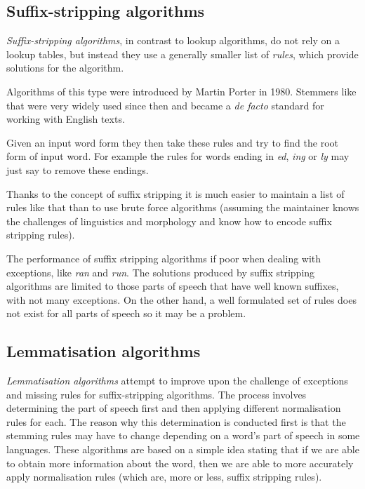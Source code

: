     \subsection{Suffix-stripping algorithms}

      \emph{Suffix-stripping algorithms}, in contrast to lookup algorithms, do not rely on a lookup tables, but instead they use a generally smaller list of \emph{rules}, which provide solutions for the algorithm.

      Algorithms of this type were introduced by Martin Porter in 1980\cite{Porter1980}. Stemmers like that were very widely used since then and became a \emph{de facto} standard for working with English texts.
      
      Given an input word form they then take these rules and try to find the root form of input word. For example the rules for words ending in \emph{ed}, \emph{ing} or \emph{ly} may just say to remove these endings.

      Thanks to the concept of suffix stripping it is much easier to maintain a list of rules like that than to use brute force algorithms (assuming the maintainer knows the challenges of linguistics and morphology and know how to encode suffix stripping rules).
      
      The performance of suffix stripping algorithms if poor when dealing with exceptions, like \emph{ran} and \emph{run}. The solutions produced by suffix stripping algorithms are limited to those parts of speech that have well known suffixes, with not many exceptions. On the other hand, a well formulated set of rules does not exist for all parts of speech so it may be a problem.

    \subsection{Lemmatisation algorithms}

      \emph{Lemmatisation algorithms} attempt to improve upon the challenge of exceptions and missing rules for suffix-stripping algorithms. The process involves determining the part of speech first and then applying different normalisation rules for each. The reason why this determination is conducted first is that the stemming rules may have to change depending on a word's part of speech in some languages. These algorithms are based on a simple idea stating that if we are able to obtain more information about the word, then we are able to more accurately apply normalisation rules (which are, more or less, suffix stripping rules).

